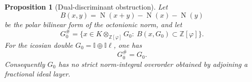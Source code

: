 \documentclass[12pt,oneside,english]{amsart}
\numberwithin{equation}{section}
\numberwithin{figure}{section}
\numberwithin{table}{section}
\theoremstyle{plain}
\newtheorem{proposition}[theorem]{Proposition}
\theoremstyle{definition}
\theoremstyle{remark}
\newcommand{\Zphi}{\mathbb Z[\varphi]}
\newcommand{\Norm}{\operatorname{N}}
\begin{document}
\begin{proposition}[Dual-discriminant obstruction]
\label{prop:dual-discriminant}
Let
\begin{equation}
B(x,y)=\Norm(x+y)-\Norm(x)-\Norm(y)
\label{eq:norm-polar-pairing}
\end{equation}
be the polar bilinear form of the octonionic norm, and let
\begin{equation}
G_0^\#=\{x\in K\otimes_{\Zphi}G_0:\ B(x,G_0)\subset\Zphi\}.
\label{eq:g0-dual}
\end{equation}
For the icosian double \(G_0=\mathbb I\oplus\mathbb I\ell\), one has
\begin{equation}
G_0^\#=G_0.
\end{equation}
Consequently \(G_0\) has no strict norm-integral overorder obtained by adjoining a fractional ideal layer.
\end{proposition}
\end{document}
